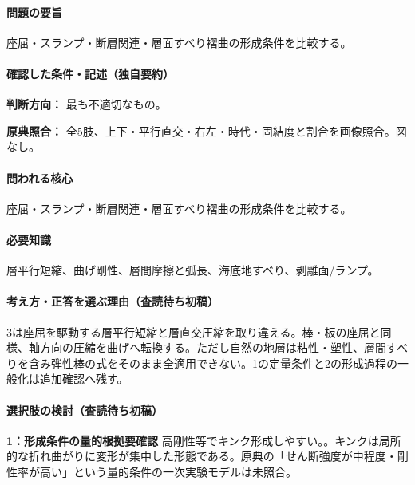 \paragraph{問題の要旨} 座屈・スランプ・断層関連・層面すべり褶曲の形成条件を比較する。

\paragraph{確認した条件・記述（独自要約）}\mbox{}\par

\noindent\textbf{判断方向：} 最も不適切なもの。\par

\noindent\textbf{原典照合：} 全5肢、上下・平行直交・右左・時代・固結度と割合を画像照合。図なし。\par

\paragraph{問われる核心} 座屈・スランプ・断層関連・層面すべり褶曲の形成条件を比較する。

\paragraph{必要知識} 層平行短縮、曲げ剛性、層間摩擦と弧長、海底地すべり、剥離面/ランプ。

\paragraph{考え方・正答を選ぶ理由（査読待ち初稿）} 3は座屈を駆動する層平行短縮と層直交圧縮を取り違える。棒・板の座屈と同様、軸方向の圧縮を曲げへ転換する。ただし自然の地層は粘性・塑性、層間すべりを含み弾性棒の式をそのまま全適用できない。1の定量条件と2の形成過程の一般化は追加確認へ残す。

\paragraph{選択肢の検討（査読待ち初稿）}\mbox{}\par

\noindent\textbf{1：形成条件の量的根拠要確認} 高剛性等でキンク形成しやすい。。キンクは局所的な折れ曲がりに変形が集中した形態である。原典の「せん断強度が中程度・剛性率が高い」という量的条件の一次実験モデルは未照合。\par

